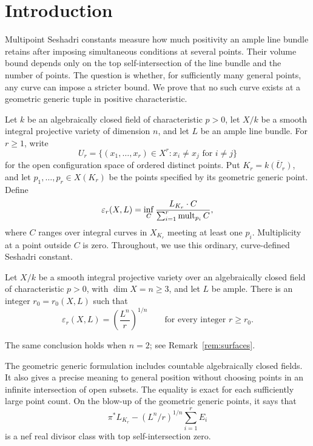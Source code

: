 \section{Introduction}\label{sec:introduction}

Multipoint Seshadri constants measure how much positivity an ample line
bundle retains after imposing simultaneous conditions at several points.
Their volume bound depends only on the top self-intersection of the line
bundle and the number of points. The question is whether, for sufficiently
many general points, any curve can impose a stricter bound. We prove that
no such curve exists at a geometric generic tuple in positive
characteristic.

Let $k$ be an algebraically closed field of characteristic $p>0$, let
$X/k$ be a smooth integral projective variety of dimension $n$, and let
$L$ be an ample line bundle. For $r\ge1$, write
\[
 U_r=\{(x_1,\ldots,x_r)\in X^r:x_i\ne x_j\text{ for }i\ne j\}
\]
for the open configuration space of ordered distinct points. Put
$K_r=\overline{k(U_r)}$, and let $p_1,\ldots,p_r\in X(K_r)$ be the
points specified by its geometric generic point. Define
\begin{equation}\label{eq:generic-seshadri}
 \varepsilon_r(X,L)=\inf_C
 \frac{L_{K_r}\cdot C}{\sum_{i=1}^r\operatorname{mult}_{p_i}C},
\end{equation}
where $C$ ranges over integral curves in $X_{K_r}$ meeting at least one
$p_i$. Multiplicity at a point outside $C$ is zero. Throughout, we use
this ordinary, curve-defined Seshadri constant.

\begin{theorem}\label{thm:main}
Let $X/k$ be a smooth integral projective variety over an algebraically
closed field of characteristic $p>0$, with $\dim X=n\ge3$, and let $L$
be ample. There is an integer $r_0=r_0(X,L)$ such that
\[
 \varepsilon_r(X,L)=\left(\frac{L^n}{r}\right)^{1/n}
 \qquad\text{for every integer }r\ge r_0.
\]
\end{theorem}

The same conclusion holds when $n=2$; see Remark~\ref{rem:surfaces}.

The geometric generic formulation includes countable algebraically closed
fields. It also gives a precise meaning to general position without
choosing points in an infinite intersection of open subsets. The equality
is exact for each sufficiently large point count. On the blow-up of the
geometric generic points, it says that
\[
 \pi^*L_{K_r}-(L^n/r)^{1/n}\sum_{i=1}^r E_i
\]
is a nef real divisor class with top self-intersection zero.

